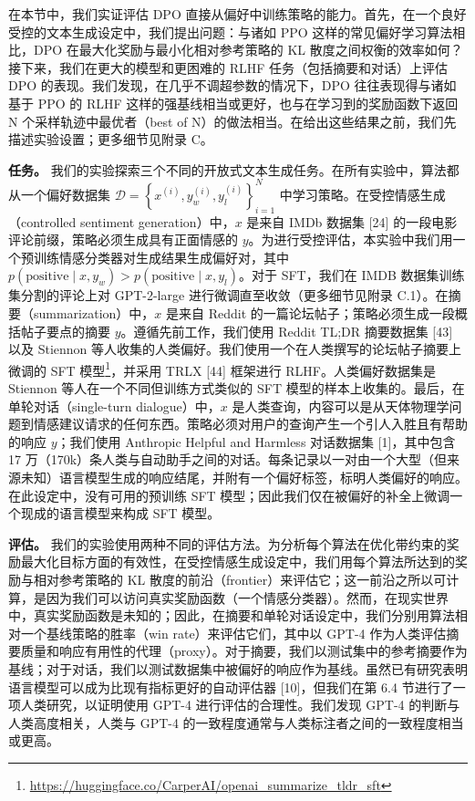 \documentclass[11pt,UTF8,fontset=fandol]{ctexart}
\begin{document}
在本节中，我们实证评估 DPO 直接从偏好中训练策略的能力。首先，在一个良好受控的文本生成设定中，我们提出问题：与诸如 PPO 这样的常见偏好学习算法相比，DPO 在最大化奖励与最小化相对参考策略的 KL 散度之间权衡的效率如何？接下来，我们在更大的模型和更困难的 RLHF 任务（包括摘要和对话）上评估 DPO 的表现。我们发现，在几乎不调超参数的情况下，DPO 往往表现得与诸如基于 PPO 的 RLHF 这样的强基线相当或更好，也与在学习到的奖励函数下返回 N 个采样轨迹中最优者（best of N）的做法相当。在给出这些结果之前，我们先描述实验设置；更多细节见附录 C。

\textbf{任务。} 我们的实验探索三个不同的开放式文本生成任务。在所有实验中，算法都从一个偏好数据集 $\mathcal{D} = \left\{x^{(i)}, y_w^{(i)}, y_l^{(i)}\right\}_{i=1}^N$ 中学习策略。在受控情感生成（controlled sentiment generation）中，$x$ 是来自 IMDb 数据集 [24] 的一段电影评论前缀，策略必须生成具有正面情感的 $y$。为进行受控评估，本实验中我们用一个预训练情感分类器对生成结果生成偏好对，其中 $p(\text{positive} \mid x, y_w) > p(\text{positive} \mid x, y_l)$。对于 SFT，我们在 IMDB 数据集训练集分割的评论上对 GPT-2-large 进行微调直至收敛（更多细节见附录 C.1）。在摘要（summarization）中，$x$ 是来自 Reddit 的一篇论坛帖子；策略必须生成一段概括帖子要点的摘要 $y$。遵循先前工作，我们使用 Reddit TL;DR 摘要数据集 [43] 以及 Stiennon 等人收集的人类偏好。我们使用一个在人类撰写的论坛帖子摘要上微调的 SFT 模型\footnote{\url{https://huggingface.co/CarperAI/openai_summarize_tldr_sft}}，并采用 TRLX [44] 框架进行 RLHF。人类偏好数据集是 Stiennon 等人在一个不同但训练方式类似的 SFT 模型的样本上收集的。最后，在单轮对话（single-turn dialogue）中，$x$ 是人类查询，内容可以是从天体物理学问题到情感建议请求的任何东西。策略必须对用户的查询产生一个引人入胜且有帮助的响应 $y$；我们使用 Anthropic Helpful and Harmless 对话数据集 [1]，其中包含 17 万（170k）条人类与自动助手之间的对话。每条记录以一对由一个大型（但来源未知）语言模型生成的响应结尾，并附有一个偏好标签，标明人类偏好的响应。在此设定中，没有可用的预训练 SFT 模型；因此我们仅在被偏好的补全上微调一个现成的语言模型来构成 SFT 模型。

\textbf{评估。} 我们的实验使用两种不同的评估方法。为分析每个算法在优化带约束的奖励最大化目标方面的有效性，在受控情感生成设定中，我们用每个算法所达到的奖励与相对参考策略的 KL 散度的前沿（frontier）来评估它；这一前沿之所以可计算，是因为我们可以访问真实奖励函数（一个情感分类器）。然而，在现实世界中，真实奖励函数是未知的；因此，在摘要和单轮对话设定中，我们分别用算法相对一个基线策略的胜率（win rate）来评估它们，其中以 GPT-4 作为人类评估摘要质量和响应有用性的代理（proxy）。对于摘要，我们以测试集中的参考摘要作为基线；对于对话，我们以测试数据集中被偏好的响应作为基线。虽然已有研究表明语言模型可以成为比现有指标更好的自动评估器 [10]，但我们在第 6.4 节进行了一项人类研究，以证明使用 GPT-4 进行评估的合理性。我们发现 GPT-4 的判断与人类高度相关，人类与 GPT-4 的一致程度通常与人类标注者之间的一致程度相当或更高。
\end{document}
